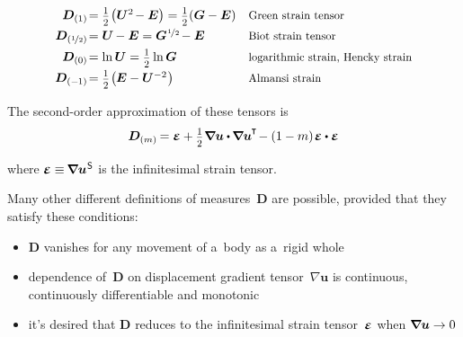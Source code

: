 \nopagebreak\begin{equation*}
\begin{array}{r@{\hspace{0.1em}}ll}
\bm{D}_{(1)} & = \smalldisplaystyleonehalf \hspace{-0.25ex} \left( \bm{U}^{2} \hspace{-0.25ex} - \bm{E} \right) = \smalldisplaystyleonehalf (\bm{G} - \bm{E}) & \text{\scalebox{0.9}{Green strain tensor}}
\\[.4em]
\bm{D}_{(\nicefrac{1}{2})} & = \bm{U} \hspace{-0.15ex} - \bm{E} = \bm{G}^{\hspace{.1ex}\nicefrac{1}{2}} \hspace{-0.25ex} - \bm{E} & \text{\scalebox{0.9}{Biot strain tensor}}
\\[.4em]
\bm{D}_{(0)} & = \ln \bm{U} = \smalldisplaystyleonehalf \ln \bm{G} & \text{\scalebox{0.9}{logarithmic strain, Hencky strain}}
\\[.4em]
\bm{D}_{(-\hspace{-0.1ex}1)} & = \smalldisplaystyleonehalf \hspace{-0.25ex} \left( \hspace{-0.1ex} \bm{E} - \bm{U}^{-2} \hspace{.1ex} \right) & \text{\scalebox{0.9}{Almansi strain}}
\end{array}
\end{equation*}

The second\hbox{-}order approximation of these tensors is
\[ \bm{D}_{(m)} \hspace{-0.2ex} =
\mathboldepsilon
+ \smalldisplaystyleonehalf \hspace{.1ex} \boldnabla\bm{u} \dotp \hspace{-0.1ex} \boldnabla\bm{u}^{\hspace{-0.1ex}\T} \hspace{-0.3ex}
- (1 - m) \hspace{.2ex} \mathboldepsilon \dotp \mathboldepsilon \]

\vspace{-0.25em} \noindent where ${\mathboldepsilon \equiv \hspace{-0.2ex} \boldnabla {\bm{u}}^{\hspace{.1ex}\mathsf{S}}}$ is the infinitesimal strain tensor.

Many other different definitions of measures~$\bm{D}$ are possible, provided that they satisfy these conditions:

\begin{itemize}
\item $\bm{D}$ vanishes for any movement of a~body as a~rigid whole
\item dependence of~$\bm{D}$ on displacement gradient tensor~${\nabla \bm{u}}$ is continuous, continuously differentiable and monotonic
\item it’s desired that $\bm{D}$ reduces to the infinitesimal strain tensor~${\mathboldepsilon}$ when ${\bm{\nabla}\hspace{-0.2ex} \bm{u} \to 0}$
\end{itemize}

